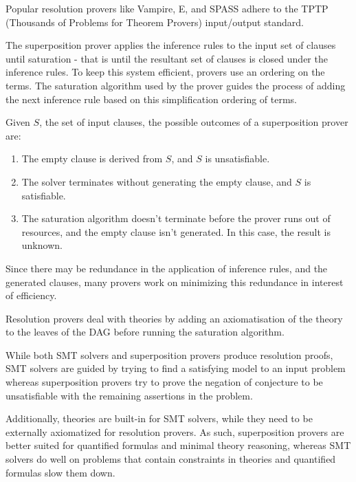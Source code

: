\documentclass{article}
\begin{document}
	Popular resolution provers like Vampire, E, and 
	SPASS adhere to the TPTP (Thousands of Problems 
	for Theorem Provers) input/output standard.
	
	The superposition prover applies the inference 
	rules to the input set of 
	clauses until saturation - that is until the 
	resultant set of clauses is closed under the 
	inference rules. To keep this system
	efficient, provers use an ordering 
	on the terms. The saturation algorithm used 
	by the prover guides the process of adding the 
	next inference rule based on this simplification 
	ordering of terms.
	
	Given $S$, the set of input clauses, the possible 
	outcomes of a superposition prover are:
	\begin{enumerate}
		\item The empty clause is derived from $S$, and
		$S$ is unsatisfiable.
		\item The solver terminates without generating the 
		empty clause, and $S$ is satisfiable.
		\item The saturation algorithm doesn't terminate 
		before the prover runs out of resources, and 
		the empty clause isn't generated. In this 
		case, the result is unknown. 
	\end{enumerate}
	
	Since there may be redundance in the application 
	of inference rules, and the generated clauses, 
	many provers work on minimizing this redundance in 
	interest of efficiency.
	
	Resolution provers deal with theories by 
	adding an axiomatisation of the theory to the 
	leaves of the DAG before running the 
	saturation algorithm.
	
	While both SMT solvers and superposition provers 
	produce resolution proofs, SMT solvers are guided 
	by trying to find a satisfying model to an input 
	problem whereas superposition provers try 
	to prove the negation of conjecture to be unsatisfiable
	with the remaining assertions in the problem. 
	
	Additionally, theories are built-in for SMT solvers,
	while they need to be externally axiomatized for 
	resolution provers. As such, superposition provers
	are better suited for quantified formulas and 
	minimal theory reasoning, whereas SMT solvers 
	do well on problems that contain constraints 
	in theories and quantified formulas slow them 
	down.
	
\end{document}
